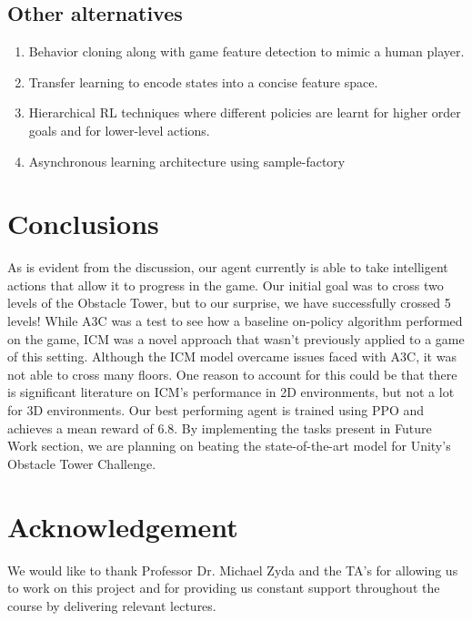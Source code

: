 \documentclass[conference]{IEEEtran}
\begin{document}
\subsection{\textbf{Other alternatives}}
\begin{enumerate}
    \item Behavior cloning along with game feature detection to mimic a human player.
    \item Transfer learning to encode states into a concise feature space.
    \item Hierarchical RL techniques where different policies are learnt for higher order goals and for lower-level actions.
    \item Asynchronous learning architecture using sample-factory
\end{enumerate}

\section{Conclusions}

As is evident from the discussion, our agent currently is able to take intelligent actions that allow it to progress in the game. Our initial goal was to cross two levels of the Obstacle Tower, but to our surprise, we have successfully crossed 5 levels! While A3C was a test to see how a baseline on-policy algorithm performed on the game, ICM was a novel approach that wasn’t previously applied to a game of this setting. Although the ICM model overcame issues faced with A3C, it was not able to cross many floors. One reason to account for this could be that there is significant literature on ICM’s performance in 2D environments, but not a lot for 3D environments. Our best performing agent is trained using PPO and achieves a mean reward of 6.8. By implementing the tasks present in Future Work section, we are planning on beating the state-of-the-art model for Unity's Obstacle Tower Challenge.

\section{Acknowledgement}

We would like to thank Professor Dr. Michael Zyda and the TA's for allowing us to work on this project and for providing us constant support throughout the course by delivering relevant lectures.
\end{document}
